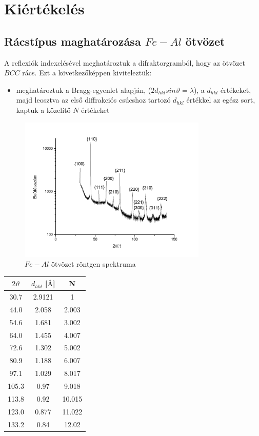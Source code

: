 \documentclass[a4paper,12pt]{article}
\begin{document}
\section{Kiértékelés}

\subsection{Rácstípus maghatározása $Fe-Al$ ötvözet}

\par A reflexiók indexelésével meghatároztuk a difraktorgramból, hogy az ötvözet $BCC$ rács. Ezt a következőképpen kiviteleztük:

\begin{itemize}
\item meghatároztuk a Bragg-egyenlet alapján, ($2d_{hkl}sin\vartheta = \lambda$), a $d_{hkl}$ értékeket, majd leosztva az első diffrakciós csúcshoz tartozó $d_{hkl}$ értékkel az egész sort, kaptuk a közelítő $N$ értékeket
\end{itemize} 

\begin{figure}[H]
\centering
\includegraphics[width=0.8\textwidth]{./fel1.png}
\caption{$Fe-Al$ ötvözet röntgen spektruma}
\end{figure} 

\begin{center}
\begin{tabular}{|c|c|c|}
\hline
$2\vartheta$ & $d_{hkl}$ [$\si{\angstrom}$] & N \\
\hline
30.7 &2.9121 & 1 \\
\hline
44.0 & 2.058 & 2.003 \\
\hline
54.6 & 1.681 & 3.002 \\
\hline
64.0 & 1.455 & 4.007 \\
\hline
72.6 & 1.302 & 5.002 \\
\hline
80.9 & 1.188 & 6.007 \\
\hline
97.1 & 1.029 & 8.017 \\
\hline
105.3 & 0.97 & 9.018 \\
\hline
113.8 & 0.92 & 10.015 \\
\hline
123.0 & 0.877 & 11.022 \\
\hline
133.2 & 0.84 & 12.02 \\
\hline
\end{tabular}
\end{center}
\end{document}
